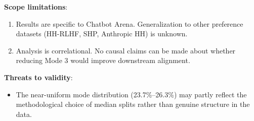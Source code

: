 \textbf{Scope limitations}:
\begin{enumerate}
\item Results are specific to Chatbot Arena. Generalization to other preference datasets (HH-RLHF, SHP, Anthropic HH) is unknown.
\item Analysis is correlational. No causal claims can be made about whether reducing Mode 3 would improve downstream alignment.
\end{enumerate}

\textbf{Threats to validity}:
\begin{itemize}
\item The near-uniform mode distribution (23.7\%--26.3\%) may partly reflect the methodological choice of median splits rather than genuine structure in the data.
\end{itemize}
